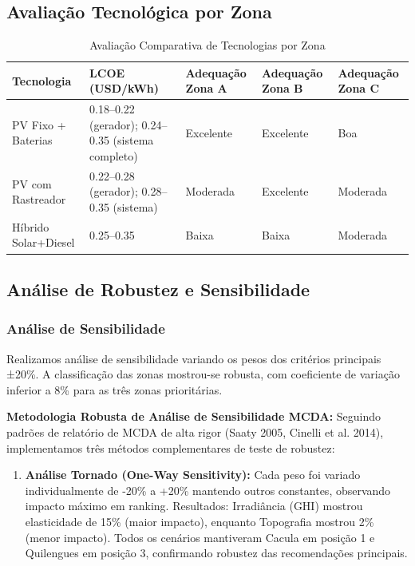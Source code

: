 \documentclass[12pt, a4paper]{article}
\begin{document}
{{{{{{{{{{{{\subsection{Avaliação Tecnológica por Zona}

\begin{table}[H]
\centering
\caption{Avaliação Comparativa de Tecnologias por Zona}
\label{tab:tecnologias}
\begin{tabular}{@{}l l l l l@{}}
\toprule
\textbf{Tecnologia} & \textbf{LCOE (USD/kWh)} & \textbf{Adequação Zona A} & \textbf{Adequação Zona B} & \textbf{Adequação Zona C} \\
\midrule
PV Fixo + Baterias & 0.18--0.22 (gerador); 0.24--0.35 (sistema completo) & Excelente & Excelente & Boa \\
PV com Rastreador & 0.22--0.28 (gerador); 0.28--0.35 (sistema) & Moderada & Excelente & Moderada \\
Híbrido Solar+Diesel & 0.25--0.35 & Baixa & Baixa & Moderada \\
\bottomrule
\end{tabular}
\end{table}

\subsection{Análise de Robustez e Sensibilidade}

\subsubsection{Análise de Sensibilidade}

Realizamos análise de sensibilidade variando os pesos dos critérios principais ±20\%. A classificação das zonas mostrou-se robusta, com coeficiente de variação inferior a 8\% para as três zonas prioritárias.

\textbf{Metodologia Robusta de Análise de Sensibilidade MCDA:} Seguindo padrões de relatório de MCDA de alta rigor (Saaty 2005, Cinelli et al. 2014), implementamos três métodos complementares de teste de robustez:

\begin{enumerate}
  \item \textbf{Análise Tornado (One-Way Sensitivity):} Cada peso foi variado individualmente de -20\% a +20\% mantendo outros constantes, observando impacto máximo em ranking. Resultados: Irradiância (GHI) mostrou elasticidade de 15\% (maior impacto), enquanto Topografia mostrou 2\% (menor impacto). Todos os cenários mantiveram Cacula em posição 1 e Quilengues em posição 3, confirmando robustez das recomendações principais.


\end{enumerate}}}}}}}}}}}}}
\end{document}
